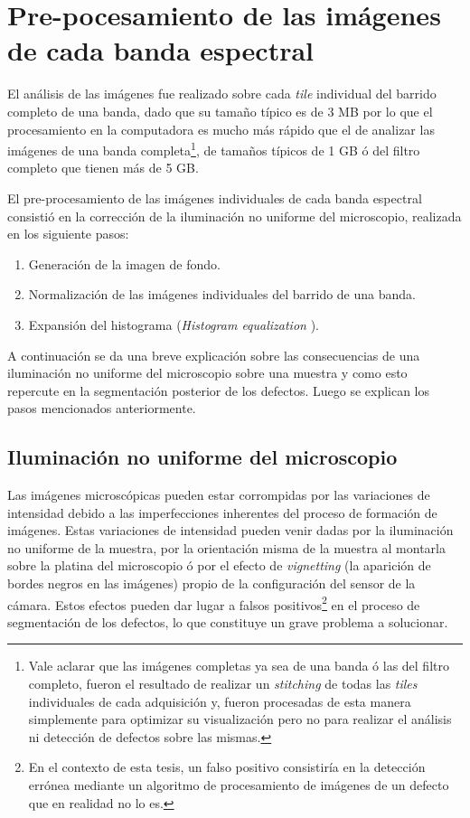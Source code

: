 \singlespacing
\section{Pre-pocesamiento de las imágenes de cada banda espectral }

\hspace{0.5cm}El análisis de las imágenes fue realizado sobre cada \textit{tile} individual del barrido completo de una banda, dado que su tamaño típico es de 3 MB por lo que el procesamiento en la computadora es mucho más rápido que el de analizar las imágenes de una banda completa\footnote{Vale aclarar que las imágenes completas ya sea de una banda ó las del filtro completo, fueron el resultado de realizar un \textit{stitching} de todas las \textit{tiles} individuales de cada adquisición y, fueron procesadas de esta manera simplemente para optimizar su visualización pero no para realizar el análisis ni detección de defectos sobre las mismas.}, de tamaños típicos de 1 GB ó del filtro completo que tienen más de 5 GB.

El pre-procesamiento de las imágenes individuales de cada banda espectral consistió en la corrección de la iluminación no uniforme del microscopio, realizada en los siguiente pasos:
\begin{enumerate}
\justifying
\item Generación de la imagen de fondo.
\item Normalización de las imágenes individuales del barrido de una banda.
\item Expansión del histograma (\textit{Histogram equalization} \cite{anilfund}).
\end{enumerate}

A continuación se da una breve explicación sobre las consecuencias de una iluminación no uniforme del microscopio sobre una muestra y como esto repercute en la segmentación posterior de los defectos. Luego se explican los pasos mencionados anteriormente.

\singlespacing
\subsection{Iluminación no uniforme del microscopio}

\hspace{0.5cm}Las imágenes microscópicas pueden estar corrompidas por las variaciones de intensidad debido a las imperfecciones inherentes del proceso de formación de imágenes. Estas variaciones de intensidad pueden venir dadas por la iluminación no uniforme de la muestra, por la orientación misma de la muestra al montarla sobre la platina del microscopio ó por el efecto de \textit{vignetting} (la aparición de bordes negros en las imágenes) propio de la configuración del sensor de la cámara. Estos efectos pueden dar lugar a falsos positivos\footnote{En el contexto de esta tesis, un falso positivo consistiría en la detección errónea mediante un algoritmo de procesamiento de imágenes de un defecto que en realidad no lo es.} en el proceso de segmentación de los defectos, lo que constituye un grave problema a solucionar.

